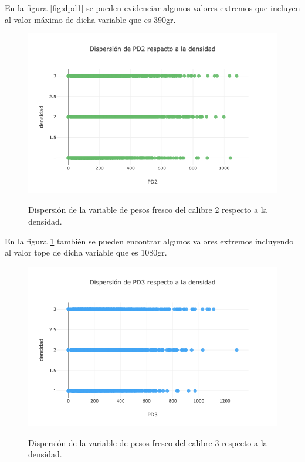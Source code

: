 En la figura \ref{fig:dpd1} se pueden evidenciar algunos valores extremos que incluyen al valor máximo de dicha variable que es 390gr.

\begin{figure}[h!]
	\caption{Dispersión de la variable de pesos fresco del calibre 2 respecto a la densidad.}
	\centering
	\includegraphics[scale=0.5]{d-pd2.png}
	\label{fig:dpd2}
\end{figure}

En la figura \ref{fig:dpd2} también se pueden encontrar algunos valores extremos incluyendo al valor tope de dicha variable que es 1080gr.

\begin{figure}[h!]
	\caption{Dispersión de la variable de pesos fresco del calibre 3 respecto a la densidad.}
	\centering
	\includegraphics[scale=0.5]{d-pd3.png}
	\label{fig:dpd3}
\end{figure}

